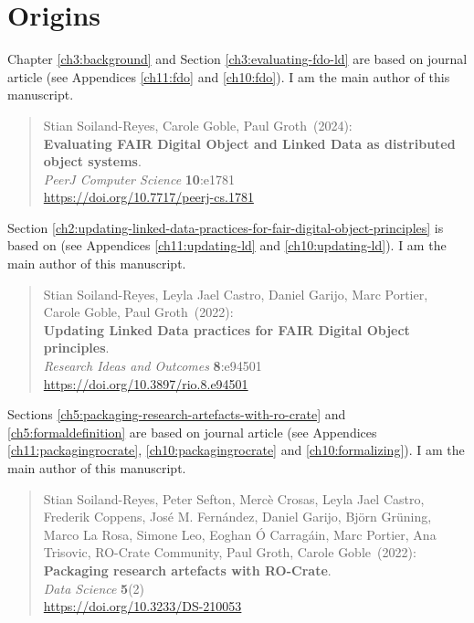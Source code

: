 

\section{Origins}
\label{intro:origins}

Chapter \ref{ch3:background} and Section \ref{ch3:evaluating-fdo-ld} are based on journal article \cite{Soiland-Reyes 2024b}  (see Appendices \ref{ch11:fdo} and \ref{ch10:fdo}). I am the main author of this manuscript.

\begin{quote}
    \small
Stian Soiland-Reyes, Carole Goble, Paul Groth~(2024): \\
\textbf{Evaluating FAIR Digital Object and Linked Data as distributed object systems}.\\
\emph{PeerJ Computer Science} \textbf{10}:e1781 \\
\url{https://doi.org/10.7717/peerj-cs.1781} 
\end{quote}

Section \ref{ch2:updating-linked-data-practices-for-fair-digital-object-principles} is based on \cite{Soiland-Reyes 2022d} (see Appendices \ref{ch11:updating-ld} and \ref{ch10:updating-ld}). I am the main author of this manuscript.

\begin{quote}
    \small
    Stian Soiland-Reyes, Leyla Jael Castro, Daniel Garijo, Marc Portier, Carole Goble, Paul Groth~(2022): \\
    \textbf{Updating Linked Data practices for FAIR Digital Object principles}. \\
    \emph{Research Ideas and Outcomes} \textbf{8}:e94501 \\
    \url{https://doi.org/10.3897/rio.8.e94501}
\end{quote}

Sections \ref{ch5:packaging-research-artefacts-with-ro-crate} and \ref{ch5:formaldefinition} are based on journal article \cite{Soiland-Reyes 2022a} (see Appendices \ref{ch11:packagingrocrate}, \ref{ch10:packagingrocrate} and \ref{ch10:formalizing}). I am the main author of this manuscript.

\begin{quote}
    \small
    Stian Soiland-Reyes, Peter Sefton, Mercè Crosas, Leyla Jael Castro, Frederik Coppens, José M. Fernández, Daniel Garijo, Björn Grüning, Marco La Rosa, Simone Leo, Eoghan Ó Carragáin, Marc Portier, Ana Trisovic, RO-Crate Community, Paul Groth, Carole Goble~(2022): \\
    \textbf{Packaging research artefacts with RO-Crate}.\\
    \emph{Data Science} \textbf{5}(2)\\
    \url{https://doi.org/10.3233/DS-210053}\\
\end{quote}

